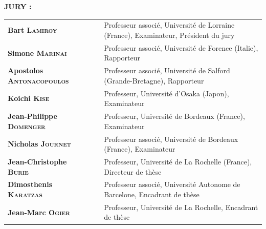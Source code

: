 \textsc{\textbf{JURY : }}  $\ $ \vspace{0.2cm} \\
\begin{tabular}{l p{1cm} p{10cm}}
  \textbf{Bart \textsc{Lamiroy}} & $\ $ &  Professeur associ{\'e}, Universit{\'e} de Lorraine (France), Examinateur, Pr{\'e}sident du jury\\
  \textbf{Simone \textsc{Marinai}} & $\ $ &  Professeur associ{\'e}, Universit{\'e} de Forence (Italie), Rapporteur\\
  \textbf{Apostolos \textsc{Antonacopoulos}} & $\ $ &  Professeur associ{\'e}, Universit{\'e} de Salford (Grande-Bretagne), Rapporteur\\
  \textbf{Koichi \textsc{Kise}} & $\ $ &  Professeur, Universit{\'e} d'Osaka (Japon), Examinateur\\
  \textbf{Jean-Philippe \textsc{Domenger}} & $\ $ &  Professeur, Universit{\'e} de Bordeaux (France), Examinateur\\
  \textbf{Nicholas \textsc{Journet}} & $\ $ &  Professeur associ{\'e}, Universit{\'e} de Bordeaux (France), Examinateur\\
  \textbf{Jean-Christophe \textsc{Burie}} & $\ $ &  Professeur, Universit{\'e} de La Rochelle (France), Directeur de th{\`e}se\\
  \textbf{Dimosthenis \textsc{Karatzas}} & $\ $ &  Professeur associ{\'e}, Universit{\'e} Autonome de Barcelone, Encadrant de th{\`e}se\\
  \textbf{Jean-Marc \textsc{Ogier}} & $\ $ &  Professeur, Universit{\'e} de La Rochelle, Encadrant de th{\`e}se\\
  
\end{tabular}


\setlength{\voffset}{0pt}
